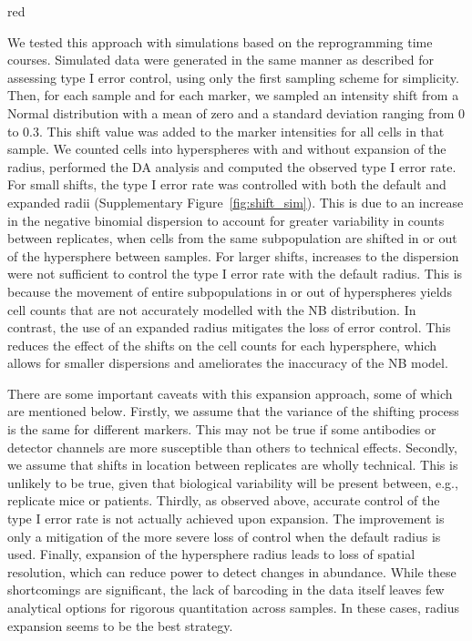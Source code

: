 \documentclass{article}
\begin{document}
\begin{color}{red}

We tested this approach with simulations based on the reprogramming time courses.
Simulated data were generated in the same manner as described for assessing type I error control, using only the first sampling scheme for simplicity.
Then, for each sample and for each marker, we sampled an intensity shift from a Normal distribution with a mean of zero and a standard deviation ranging from 0 to 0.3.
This shift value was added to the marker intensities for all cells in that sample.
We counted cells into hyperspheres with and without expansion of the radius, performed the DA analysis and computed the observed type I error rate.
For small shifts, the type I error rate was controlled with both the default and expanded radii (Supplementary Figure~\ref{fig:shift_sim}).
This is due to an increase in the negative binomial dispersion to account for greater variability in counts between replicates, when cells from the same subpopulation are shifted in or out of the hypersphere between samples. 
For larger shifts, increases to the dispersion were not sufficient to control the type I error rate with the default radius.
This is because the movement of entire subpopulations in or out of hyperspheres yields cell counts that are not accurately modelled with the NB distribution.
In contrast, the use of an expanded radius mitigates the loss of error control.
This reduces the effect of the shifts on the cell counts for each hypersphere, which allows for smaller dispersions and ameliorates the inaccuracy of the NB model.

There are some important caveats with this expansion approach, some of which are mentioned below.
Firstly, we assume that the variance of the shifting process is the same for different markers.
This may not be true if some antibodies or detector channels are more susceptible than others to technical effects.
Secondly, we assume that shifts in location between replicates are wholly technical.
This is unlikely to be true, given that biological variability will be present between, e.g., replicate mice or patients.
Thirdly, as observed above, accurate control of the type I error rate is not actually achieved upon expansion.
The improvement is only a mitigation of the more severe loss of control when the default radius is used.
Finally, expansion of the hypersphere radius leads to loss of spatial resolution, which can reduce power to detect changes in abundance.
While these shortcomings are significant, the lack of barcoding in the data itself leaves few analytical options for rigorous quantitation across samples.
In these cases, radius expansion seems to be the best strategy.
\end{color}
\end{document}
